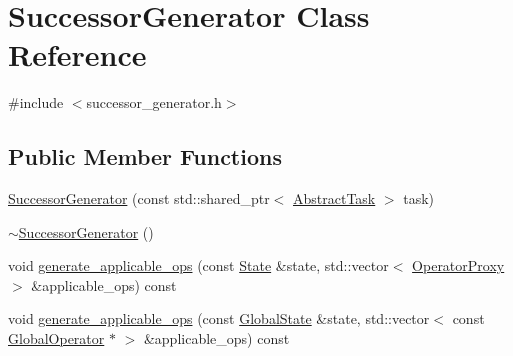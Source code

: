 \hypertarget{classSuccessorGenerator}{\section{Successor\-Generator Class Reference}
\label{classSuccessorGenerator}
}


{\ttfamily \#include $<$successor\-\_\-generator.\-h$>$}

\subsection*{Public Member Functions}
\begin{DoxyCompactItemize}
\item 
\hyperlink{classSuccessorGenerator_af2a0ac3a134815b9644b0475c05053c4}{Successor\-Generator} (const std\-::shared\-\_\-ptr$<$ \hyperlink{classAbstractTask}{Abstract\-Task} $>$ task)
\item 
\hyperlink{classSuccessorGenerator_a037022fc9ae533ef96920f8ef98bb2a2}{$\sim$\-Successor\-Generator} ()
\item 
void \hyperlink{classSuccessorGenerator_aaa61482e0e3e3d6997b961e5bdb76ee7}{generate\-\_\-applicable\-\_\-ops} (const \hyperlink{classState}{State} \&state, std\-::vector$<$ \hyperlink{classOperatorProxy}{Operator\-Proxy} $>$ \&applicable\-\_\-ops) const 
\item 
void \hyperlink{classSuccessorGenerator_ad322b90d204f8feea4791a7b4c2a3508}{generate\-\_\-applicable\-\_\-ops} (const \hyperlink{classGlobalState}{Global\-State} \&state, std\-::vector$<$ const \hyperlink{classGlobalOperator}{Global\-Operator} $\ast$ $>$ \&applicable\-\_\-ops) const 
\end{DoxyCompactItemize}


